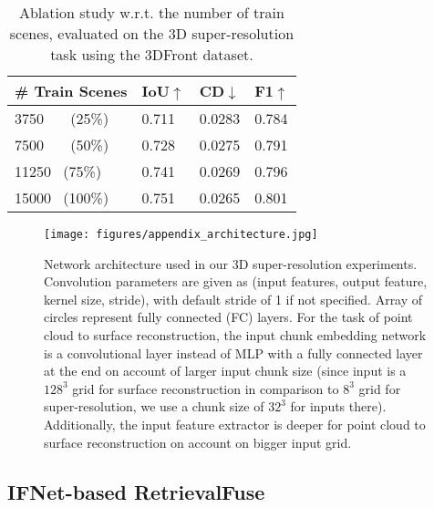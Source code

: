 \begin{table}
    \centering
    \small
    \begin{tabular}{|l|l|l|l|} 
        \hline
        \# Train Scenes & IoU$\uparrow$ & CD$\downarrow$ & F1$\uparrow$ \\ 
        \hline
        3750 ~~~(25\%) & 0.711 & 0.0283 & 0.784 \\ 
        7500 ~~~(50\%) & 0.728 & 0.0275 & 0.791 \\ 
        11250 ~(75\%) & 0.741 & 0.0269 & 0.796 \\ 
        15000 ~(100\%) & 0.751 &  0.0265 & 0.801 \\
        \hline
    \end{tabular}
    \vspace{0.15cm}
    \caption{Ablation study w.r.t. the number of train scenes, evaluated on the 3D super-resolution task using the 3DFront dataset.}
    \label{tab:num_scene}
\end{table}

\begin{figure*}
	\centering
	\texttt{[image: figures/appendix\_architecture.jpg]}
	\caption{Network architecture used in our 3D super-resolution experiments. Convolution parameters are given as (input features, output feature, kernel size, stride), with default stride of 1 if not specified. Array of circles represent fully connected (FC) layers. 
	For the task of point cloud to surface reconstruction, the input chunk embedding network is a convolutional layer instead of MLP with a fully connected layer at the end on account of larger input chunk size (since input is a $128^3$ grid for surface reconstruction in comparison to $8^3$ grid for super-resolution, we use a chunk size of $32^3$ for inputs there). Additionally, the input feature extractor is deeper for point cloud to surface reconstruction on account on bigger input grid.}
	\label{fig:architecture_refine}
\end{figure*}

\subsection{IFNet-based RetrievalFuse}

